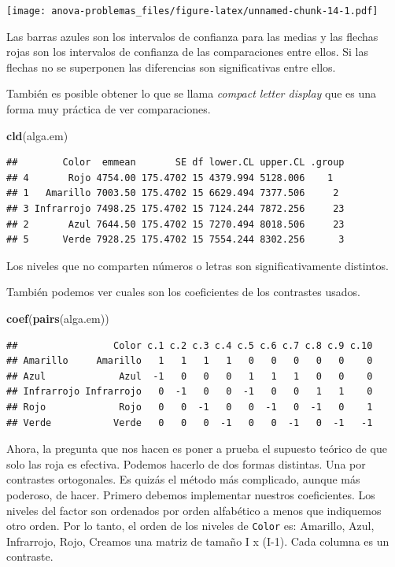 \documentclass[]{book}
\newenvironment{Shaded}{\begin{snugshade}}{\end{snugshade}}
\newcommand{\KeywordTok}[1]{\textcolor[rgb]{0.13,0.29,0.53}{\textbf{#1}}}
\newcommand{\NormalTok}[1]{#1}
\theoremstyle{definition}
\theoremstyle{definition}
\theoremstyle{definition}
\theoremstyle{remark}
\begin{document}
\texttt{[image: anova-problemas\_files/figure-latex/unnamed-chunk-14-1.pdf]}

Las barras azules son los intervalos de confianza para las medias y las
flechas rojas son los intervalos de confianza de las comparaciones entre
ellos. Si las flechas no se superponen las diferencias son
significativas entre ellos.

También es posible obtener lo que se llama \emph{compact letter display}
que es una forma muy práctica de ver comparaciones.

\begin{Shaded}
\begin{Highlighting}[]
\KeywordTok{cld}\NormalTok{(alga.em)}
\end{Highlighting}
\end{Shaded}

\begin{verbatim}
##        Color  emmean       SE df lower.CL upper.CL .group
## 4       Rojo 4754.00 175.4702 15 4379.994 5128.006    1  
## 1   Amarillo 7003.50 175.4702 15 6629.494 7377.506     2 
## 3 Infrarrojo 7498.25 175.4702 15 7124.244 7872.256     23
## 2       Azul 7644.50 175.4702 15 7270.494 8018.506     23
## 5      Verde 7928.25 175.4702 15 7554.244 8302.256      3
\end{verbatim}

Los niveles que no comparten números o letras son significativamente
distintos.

También podemos ver cuales son los coeficientes de los contrastes
usados.

\begin{Shaded}
\begin{Highlighting}[]
\KeywordTok{coef}\NormalTok{(}\KeywordTok{pairs}\NormalTok{(alga.em))}
\end{Highlighting}
\end{Shaded}

\begin{verbatim}
##                 Color c.1 c.2 c.3 c.4 c.5 c.6 c.7 c.8 c.9 c.10
## Amarillo     Amarillo   1   1   1   1   0   0   0   0   0    0
## Azul             Azul  -1   0   0   0   1   1   1   0   0    0
## Infrarrojo Infrarrojo   0  -1   0   0  -1   0   0   1   1    0
## Rojo             Rojo   0   0  -1   0   0  -1   0  -1   0    1
## Verde           Verde   0   0   0  -1   0   0  -1   0  -1   -1
\end{verbatim}

Ahora, la pregunta que nos hacen es poner a prueba el supuesto teórico
de que solo las roja es efectiva. Podemos hacerlo de dos formas
distintas. Una por contrastes ortogonales. Es quizás el método más
complicado, aunque más poderoso, de hacer. Primero debemos implementar
nuestros coeficientes. Los niveles del factor son ordenados por orden
alfabético a menos que indiquemos otro orden. Por lo tanto, el orden de
los niveles de \texttt{Color} es: Amarillo, Azul, Infrarrojo, Rojo,
Creamos una matriz de tamaño I x (I-1). Cada columna es un contraste.
\end{document}
